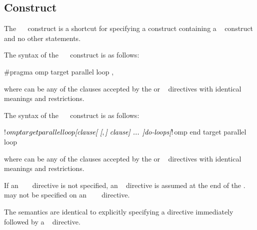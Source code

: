 \subsection{   Construct}
\label{subsec:target parallel loop Construct}
\summary
The ~~ construct is a shortcut for 
specifying a  construct containing a ~ 
construct and no other statements.

\syntax
\begin{ccppspecific}
The syntax of the ~~ construct is as follows:

\begin{ompcPragma}
#pragma omp target parallel loop \plc{[clause[ [},\plc{] clause] ... ] new-line}
\end{ompcPragma}

where  can be any of the clauses accepted by the  
or ~ directives with identical meanings and restrictions.
\end{ccppspecific}

\begin{fortranspecific}
The syntax of the ~~ construct is as follows:

\begin{ompfPragma}
!$omp target parallel loop \plc{[clause[ [},\plc{] clause] ... ]}
    \plc{do-loops}
\plc{[}!$omp end target parallel loop\plc{]}
\end{ompfPragma}

where  can be any of the clauses accepted by the  
or ~ directives with identical meanings and restrictions.

If an ~ ~ directive is not 
specified, an ~   directive 
is assumed at the end of the .  may not be specified 
on an ~~~ directive.
\end{fortranspecific}

\descr
The semantics are identical to explicitly specifying a  directive 
immediately followed by a ~ directive.


